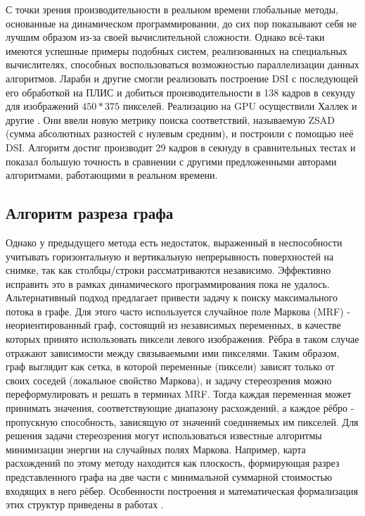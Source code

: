 С точки зрения производительности в реальном времени глобальные методы, основанные на динамическом программировании, до сих пор показывают себя не лучшим образом из-за своей вычислительной сложности.
Однако всё-таки имеются успешные примеры подобных систем, реализованных на специальных вычислителях, способных воспользоваться возможностью параллелизации данных алгоритмов. Лараби и другие \cite{FPGA_DSI} 
смогли реализовать построение DSI с последующей его обработкой на ПЛИС и добиться производительности в 138 кадров в секунду для изображений $450*375$ пикселей. Реализацию на GPU осуществили Халлек и другие \cite{CUDA_DSI}. 
Они ввели новую метрику поиска соответствий, называемую ZSAD (сумма абсолютных разностей с нулевым средним), и построили с помощью неё DSI. Алгоритм достиг производит 29 кадров в секнуду в сравнительных тестах и 
показал большую точность в сравнении с другими предложенными авторами алгоритмами, работающими в реальном времени. 

\subsection{Алгоритм разреза графа}
Однако у предыдущего метода есть недостаток, выраженный в неспособности учитывать горизонтальную и вертикальную непрерывность поверхностей на снимке, так как столбцы/строки рассматриваются независимо. Эффективно исправить 
это в рамках динамического программирования пока не удалось. Альтернативный подход предлагает привести задачу к поиску максимального потока в графе. Для этого часто используется случайное поле Маркова (MRF) - неориентированный граф,
состоящий из независимых переменных, в качестве которых принято использовать пиксели левого изображения. Рёбра в таком случае отражают зависимости между связываемыми ими пикселями. Таким образом, граф выглядит как сетка, в которой 
переменные (пиксели) зависят только от своих соседей (локальное свойство Маркова), и задачу стереозрения можно переформулировать и решать в терминах MRF.  
Тогда каждая переменная может принимать значения, соответствующие диапазону расхождений, а каждое рёбро - пропускную способность, зависящую от значений соединяемых им пикселей.  
Для решения задачи стереозрения могут использоваться известные алгоритмы минимизации энергии на случайных полях Маркова. Например, карта расхождений по этому методу находится как плоскость, формирующая разрез представленного графа на две части с минимальной 
суммарной стоимостью входящих в него рёбер. Особенности построения и математическая формализация этих структур приведены в работах \cite{graphcut,gc_ocl}. 

